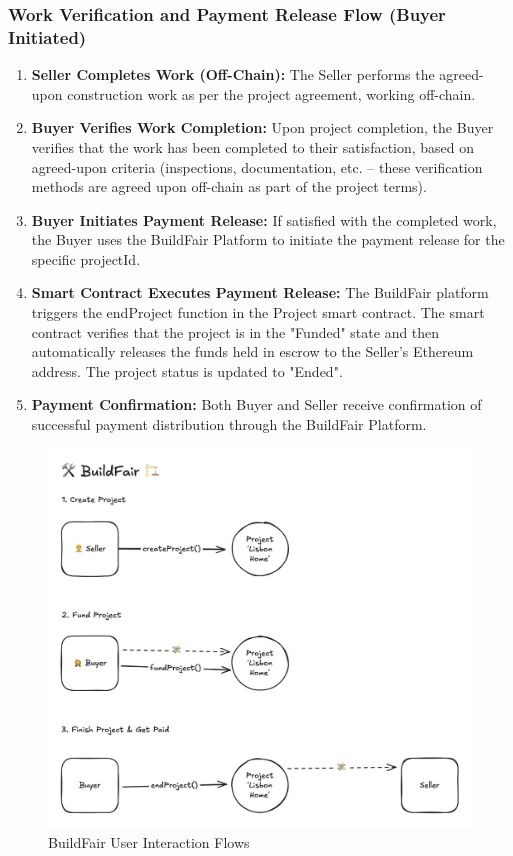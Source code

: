 \documentclass[12pt]{article}
\begin{document}
\subsubsection{Work Verification and Payment Release Flow (Buyer Initiated)}
\begin{enumerate}[label=\arabic*.]
    \item \textbf{Seller Completes Work (Off-Chain):} The Seller performs the agreed-upon construction work as per the project agreement, working off-chain.
    
    \item \textbf{Buyer Verifies Work Completion:} Upon project completion, the Buyer verifies that the work has been completed to their satisfaction, based on agreed-upon criteria (inspections, documentation, etc. – these verification methods are agreed upon off-chain as part of the project terms).
    
    \item \textbf{Buyer Initiates Payment Release:} If satisfied with the completed work, the Buyer uses the BuildFair Platform to initiate the payment release for the specific projectId.
    
    \item \textbf{Smart Contract Executes Payment Release:} The BuildFair platform triggers the endProject function in the Project smart contract. The smart contract verifies that the project is in the "Funded" state and then automatically releases the funds held in escrow to the Seller's Ethereum address. The project status is updated to "Ended".
    
    \item \textbf{Payment Confirmation:} Both Buyer and Seller receive confirmation of successful payment distribution through the BuildFair Platform.
\end{enumerate}

\begin{figure}[h]
    \centering
    \includegraphics[width=\textwidth]{../buildfair-app/public/userflows.png}
    \caption{BuildFair User Interaction Flows}
    \label{fig:userflows}
\end{figure}
\end{document}
